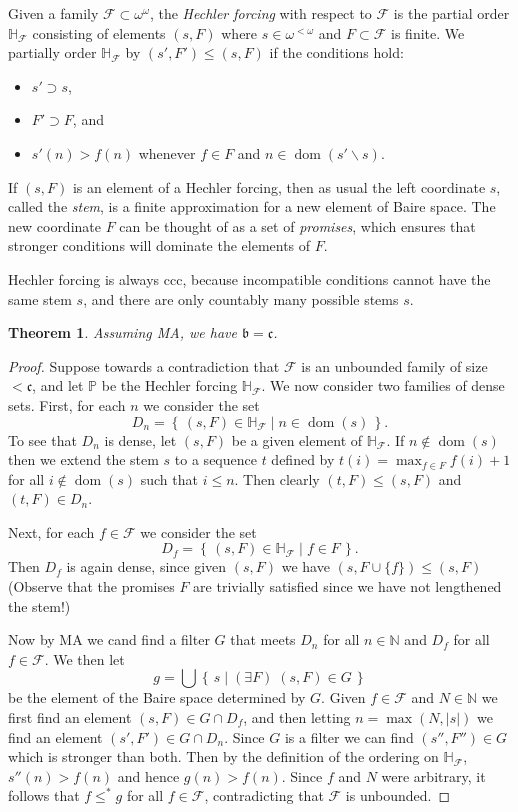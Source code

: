 \documentclass[11pt,oneside,a4paper]{amsbook}
\newcommand{\set}[1]{\left\{\,#1\,\right\}}
\newcommand{\N}{\mathbb N}
\newcommand{\PP}{\mathbb P}
\DeclareMathOperator{\dom}{dom}
\theoremstyle{definition}
\theoremstyle{plain}
\newtheorem{theorem}{Theorem}[section]
\theoremstyle{definition}
\theoremstyle{remark}
\numberwithin{equation}{section}
\numberwithin{figure}{section}
\begin{document}
Given a family $\mathcal F\subset\omega^\omega$, the \emph{Hechler forcing} with respect to $\mathcal F$ is the partial order $\mathbb H_{\mathcal F}$ consisting of elements $(s,F)$ where $s\in\omega^{<\omega}$ and $F\subset\mathcal F$ is finite. We partially order $\mathbb H_{\mathcal F}$ by $(s',F')\leq(s,F)$ if the conditions hold:
\begin{itemize}
\item $s'\supset s$,
\item $F'\supset F$, and
\item $s'(n)>f(n)$ whenever $f\in F$ and $n\in\dom(s'\smallsetminus s)$.
\end{itemize}
If $(s,F)$ is an element of a Hechler forcing, then as usual the left coordinate $s$, called the \emph{stem}, is a finite approximation for a new element of Baire space. The new coordinate $F$ can be thought of as a set of \emph{promises}, which ensures that stronger conditions will dominate the elements of $F$.

Hechler forcing is always ccc, because incompatible conditions cannot have the same stem $s$, and there are only countably many possible stems $s$.

\begin{theorem}
  Assuming MA, we have $\mathfrak b=\mathfrak c$.
\end{theorem}

\begin{proof}
  Suppose towards a contradiction that $\mathcal F$ is an unbounded family of size $<\mathfrak c$, and let $\PP$ be the Hechler forcing $\mathbb H_{\mathcal F}$. We now consider two families of dense sets. First, for each $n$ we consider the set
  \[D_n=\set{(s,F)\in\mathbb H_{\mathcal F}\mid n\in\dom(s)}\text{.}
  \]
  To see that $D_n$ is dense, let $(s,F)$ be a given element of $\mathbb H_{\mathcal F}$. If $n\notin\dom(s)$ then we extend the stem $s$ to a sequence $t$ defined by $t(i)=\max_{f\in F}f(i)+1$ for all $i\notin\dom(s)$ such that $i\leq n$. Then clearly $(t,F)\leq(s,F)$ and $(t,F)\in D_n$.

  Next, for each $f\in\mathcal F$ we consider the set
  \[D_f=\set{(s,F)\in\mathbb H_{\mathcal F}\mid f\in F}\text{.}
  \]
  Then $D_f$ is again dense, since given $(s,F)$ we have $(s,F\cup\{f\})\leq(s,F)$ (Observe that the promises $F$ are trivially satisfied since we have not lengthened the stem!)

  Now by MA we cand find a filter $G$ that meets $D_n$ for all $n\in\N$ and  $D_f$ for all $f\in\mathcal F$. We then let
  \[g=\bigcup\set{s\mid(\exists F)\;(s,F)\in G}
  \]
  be the element of the Baire space determined by $G$. Given $f\in\mathcal F$ and $N\in\N$ we first find an element $(s,F)\in G\cap D_f$, and then letting $n=\max(N,|s|)$ we find an element $(s',F')\in G\cap D_n$. Since $G$ is a filter we can find $(s'',F'')\in G$ which is stronger than both. Then by the definition of the ordering on $\mathbb H_{\mathcal F}$, $s''(n)>f(n)$ and hence $g(n)>f(n)$. Since $f$ and $N$ were arbitrary, it follows that $f\leq^*g$ for all $f\in\mathcal F$, contradicting that $\mathcal F$ is unbounded.
\end{proof}
\end{document}
